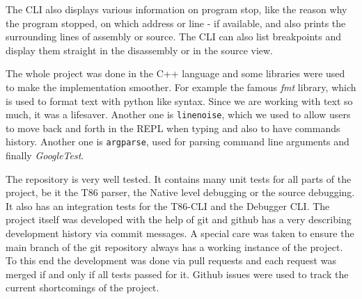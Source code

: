 The CLI also displays various information on program stop, like the reason why
the program stopped, on which address or line - if available, and also prints
the surrounding lines of assembly or source. The CLI can also list breakpoints
and display them straight in the disassembly or in the source view.

The whole project was done in the C++ language and some libraries were used to
make the implementation smoother. For example the famous \textit{fmt}
 library, which is used to format text with python like syntax.
Since we are working with text so much, it was a lifesaver. Another one is
\texttt{linenoise}, which we used to allow users to move back and forth in the
REPL when typing and also to have commands history. Another one is
\texttt{argparse}, used for parsing command line arguments and finally
\textit{GoogleTest}.

The repository is very well tested. It contains many unit tests for all parts
of the project, be it the T86 parser, the Native level debugging or the source
debugging. It also has an integration tests for the T86-CLI and the Debugger
CLI. The project itself was developed with the help of git and github has a
very describing development history via commit messages. A special care was
taken to ensure the main branch of the git repository always has a working
instance of the project. To this end the development was done via pull requests
and each request was merged if and only if all tests passed for it. Github issues
were used to track the current shortcomings of the project.
